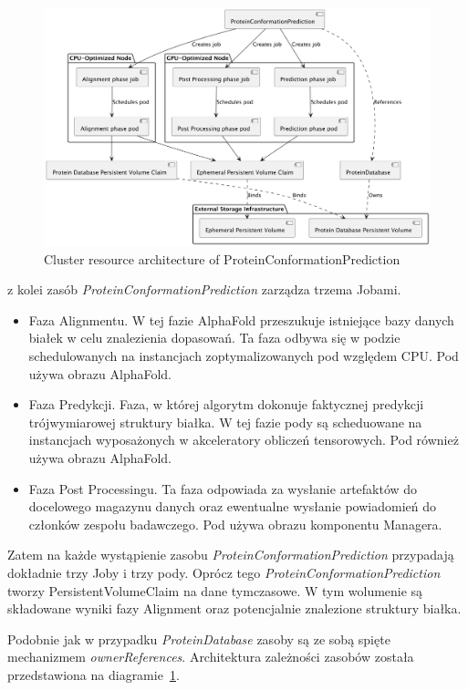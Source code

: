 \begin{figure}[htbp]
    \centering
    \includegraphics[width=\textwidth]{images/proteinconformationprediction}
    \caption{Cluster resource architecture of ProteinConformationPrediction}
    \label{fig:proteinconformationprediction}
\end{figure}

z kolei zasób \textit{ProteinConformationPrediction} zarządza trzema Jobami.
\begin{itemize}
    \item Faza Alignmentu.
    W tej fazie AlphaFold przeszukuje istniejące bazy danych białek w celu znalezienia dopasowań.
    Ta faza odbywa się w podzie schedulowanych na instancjach zoptymalizowanych pod względem CPU. Pod używa obrazu AlphaFold.
    \item Faza Predykcji.
    Faza, w której algorytm dokonuje faktycznej predykcji trójwymiarowej struktury białka.
    W tej fazie pody są scheduowane na instancjach wyposażonych w akceleratory obliczeń tensorowych.
    Pod również używa obrazu AlphaFold.
    \item Faza Post Processingu.
    Ta faza odpowiada za wysłanie artefaktów do docelowego magazynu danych oraz ewentualne wysłanie powiadomień do członków zespołu badawczego.
    Pod używa obrazu komponentu Managera.
\end{itemize}

Zatem na każde wystąpienie zasobu \textit{ProteinConformationPrediction} przypadają dokładnie trzy Joby i trzy pody.
Oprócz tego \textit{ProteinConformationPrediction} tworzy PersistentVolumeClaim na dane tymczasowe.
W tym wolumenie są składowane wyniki fazy Alignment oraz potencjalnie znalezione struktury białka.

Podobnie jak w przypadku \textit{ProteinDatabase} zasoby są ze sobą spięte mechanizmem \textit{ownerReferences}.
Architektura zależności zasobów została przedstawiona na diagramie~\ref{fig:proteinconformationprediction}.


